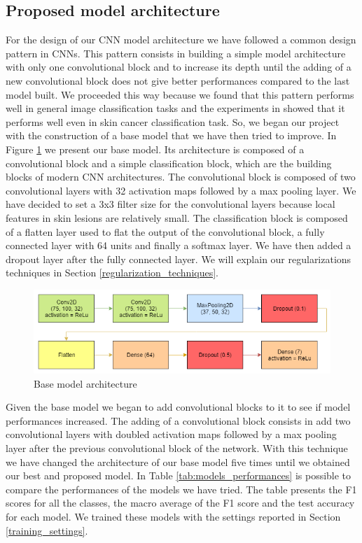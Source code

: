 	\subsection{Proposed model architecture}
	
		For the design of our CNN model architecture we have followed a common design pattern in CNNs. This pattern consists in building a simple model architecture with only one convolutional block and to increase its depth until the adding of a new convolutional block does not give better performances compared to the last model built. We proceeded this way because we found that this pattern performs well in general image classification tasks and the experiments in \cite{article2} showed that it performs well even in skin cancer classification task. So, we began our project with the construction of a base model that we have then tried to improve. In Figure \ref{fig:base_model} we present our base model. Its architecture is composed of a convolutional block and a simple classification block, which are the building blocks of modern CNN architectures. The convolutional block is composed of two convolutional layers with 32 activation maps followed by a max pooling layer. We have decided to set a 3x3 filter size for the convolutional layers because local features in skin lesions are relatively small. The classification block is composed of a flatten layer used to flat the output of the convolutional block, a fully connected layer with 64 units and finally a softmax layer. We have then added a dropout layer after the fully connected layer. We will explain our regularizations techniques in Section \ref{regularization_techniques}. 
		
		\begin{figure}[H]
			\centering
			\includegraphics[width=15cm]{images/base_model.png}
			\caption{Base model architecture}
			\label{fig:base_model}
		\end{figure}
	
		Given the base model we began to add convolutional blocks to it to see if model performances increased. The adding of a convolutional block consists in add two convolutional layers with doubled activation maps followed by a max pooling layer after the previous convolutional block of the network. With this technique we have changed the architecture of our base model five times until we obtained our best and proposed model. In Table \ref{tab:models_performances} is possible to compare the performances of the models we have tried. The table presents the F1 scores for all the classes, the macro average of the F1 score and the test accuracy for each model. We trained these models with the settings reported in Section \ref{training_settings}.
		
